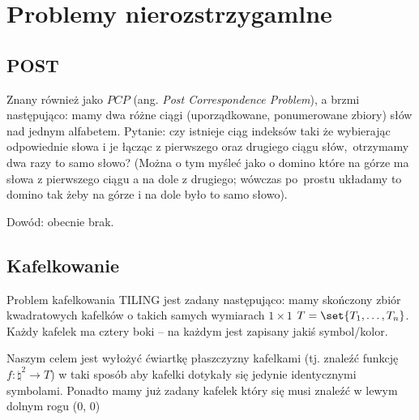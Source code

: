 \section{Problemy nierozstrzygamlne}

\subsection{POST}

Znany również jako \(PCP\) (ang. \textit{Post Correspondence Problem}), a brzmi następująco: mamy dwa różne ciągi (uporządkowane, ponumerowane zbiory) słów nad jednym alfabetem. Pytanie: czy istnieje ciąg indeksów taki że wybierając odpowiednie słowa i je łącząc z pierwszego oraz drugiego ciągu słów,\
otrzymamy dwa razy to samo słowo? (Można o tym myśleć jako o domino które na górze ma słowa z pierwszego ciągu a na dole z drugiego; wówczas po\
prostu układamy to domino tak żeby na górze i na dole było to samo słowo).

Dowód: obecnie brak.

\subsection{Kafelkowanie}

Problem kafelkowania \textsc{TILING} jest zadany następująco: mamy skończony zbiór kwadratowych kafelków o takich samych wymiarach \( 1 \times 1 \) \( T = \set{T_1, \dots, T_n} \).
Każdy kafelek ma cztery boki -- na każdym jest zapisany jakiś symbol/kolor. 

Naszym celem jest wyłożyć ćwiartkę płaszczyzny kafelkami (tj. znaleźć funkcję \( f : \natural^2 \rightarrow T \)) w taki sposób aby kafelki dotykały się jedynie identycznymi symbolami. Ponadto mamy już zadany kafelek który się musi znaleźć w lewym dolnym rogu (0, 0)


